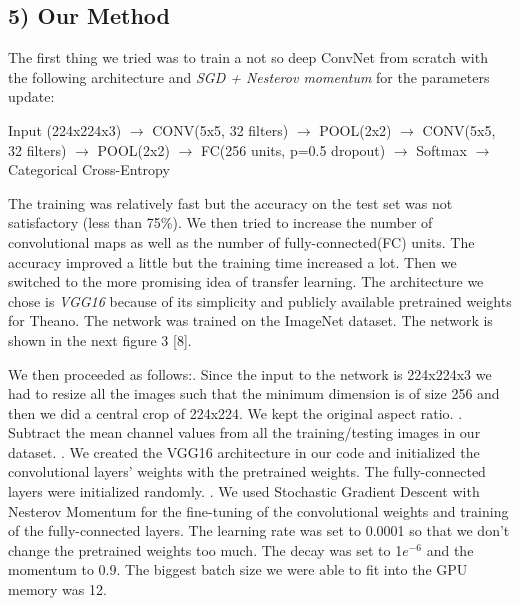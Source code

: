 \documentclass[a4paper]{article}
\begin{document}
\subsection*{5) Our Method}
\begin{justify}
The first thing we tried was to train a not so deep ConvNet from scratch with the following architecture and \textit{SGD + Nesterov momentum} for the parameters update:
\newline
\begin{tcolorbox}
Input (224x224x3) $\rightarrow$ CONV(5x5, 32 filters) $\rightarrow$ POOL(2x2) $\rightarrow$ CONV(5x5, 32 filters) $\rightarrow$ POOL(2x2) $\rightarrow$ FC(256 units, p=0.5 dropout) $\rightarrow$ Softmax $\rightarrow$ Categorical Cross-Entropy
\end{tcolorbox}

The training was relatively fast but the accuracy on the test set was not satisfactory (less than 75\%). We then tried to increase the number of convolutional maps as well as the number of fully-connected(FC) units. The accuracy improved a little but the training time increased a lot. Then we switched to the more promising idea of transfer learning. The architecture we chose is \textit{VGG16} because of its simplicity and publicly available pretrained weights for Theano. The network was trained on the ImageNet dataset. The network is shown in the next figure 3 [8].
   	\begin{tcolorbox}
   		\begin{figure}[H]
   			\begin{center}
   			\end{center}
   		\end{figure}
   	\end{tcolorbox}
   	
We then proceeded as follows:. Since the input to the network is 224x224x3 we had to resize all the images such that the minimum dimension is of size 256 and then we did a central crop of 224x224. We kept the original aspect ratio.
. Subtract the mean channel values from all the training/testing images in our dataset.
. We created the VGG16 architecture in our code and initialized the convolutional layers' weights with the pretrained weights. The fully-connected layers were initialized randomly.
. We used Stochastic Gradient Descent with Nesterov Momentum for the fine-tuning of the convolutional weights and training of the fully-connected layers. The learning rate was set to 0.0001 so that we don't change the pretrained weights too much. The decay was set to 1$e^{-6}$ and the momentum to 0.9. The biggest batch size we were able to fit into the GPU memory was 12. 
\end{justify}
\end{document}
